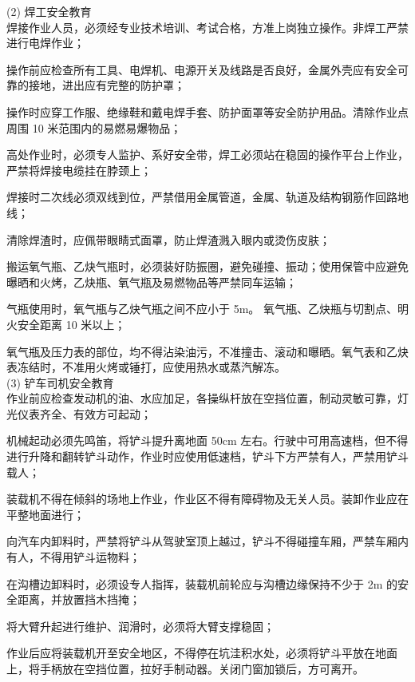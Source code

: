 (2) 焊工安全教育\\

 焊接作业人员，必须经专业技术培训、考试合格，方准上岗独立操作。非焊工严禁进行电焊作业；

 操作前应检查所有工具、电焊机、电源开关及线路是否良好，金属外壳应有安全可靠的接地，进出应有完整的防护罩；

 操作时应穿工作服、绝缘鞋和戴电焊手套、防护面罩等安全防护用品。清除作业点周围 10 米范围内的易燃易爆物品；

 高处作业时，必须专人监护、系好安全带，焊工必须站在稳固的操作平台上作业，严禁将焊接电缆挂在脖颈上；

 焊接时二次线必须双线到位，严禁借用金属管道，金属、轨道及结构钢筋作回路地线；

 清除焊渣时，应佩带眼睛式面罩，防止焊渣溅入眼内或烫伤皮肤；

 搬运氧气瓶、乙炔气瓶时，必须装好防振圈，避免碰撞、振动；使用保管中应避免曝晒和火烤，乙炔瓶、氧气瓶及易燃物品等严禁同车运输；

 气瓶使用时，氧气瓶与乙炔气瓶之间不应小于 5m。 氧气瓶、乙炔瓶与切割点、明火安全距离 10 米以上；

 氧气瓶及压力表的部位，均不得沾染油污，不准撞击、滚动和曝晒。氧气表和乙炔表冻结时，不准用火烤或锤打，应使用热水或蒸汽解冻。 \\

(3) 铲车司机安全教育\\

 作业前应检查发动机的油、水应加足，各操纵杆放在空挡位置，制动灵敏可靠，灯光仪表齐全、有效方可起动；

 机械起动必须先鸣笛，将铲斗提升离地面 50cm 左右。行驶中可用高速档，但不得进行升降和翻转铲斗动作，作业时应使用低速档，铲斗下方严禁有人，严禁用铲斗载人；

 装载机不得在倾斜的场地上作业，作业区不得有障碍物及无关人员。装卸作业应在平整地面进行；

 向汽车内卸料时，严禁将铲斗从驾驶室顶上越过，铲斗不得碰撞车厢，严禁车厢内有人，不得用铲斗运物料；

在沟槽边卸料时，必须设专人指挥，装载机前轮应与沟槽边缘保持不少于 2m 的安全距离，并放置挡木挡掩；

 将大臂升起进行维护、润滑时，必须将大臂支撑稳固；

 作业后应将装载机开至安全地区，不得停在坑洼积水处，必须将铲斗平放在地面上，将手柄放在空挡位置，拉好手制动器。关闭门窗加锁后，方可离开。\\

